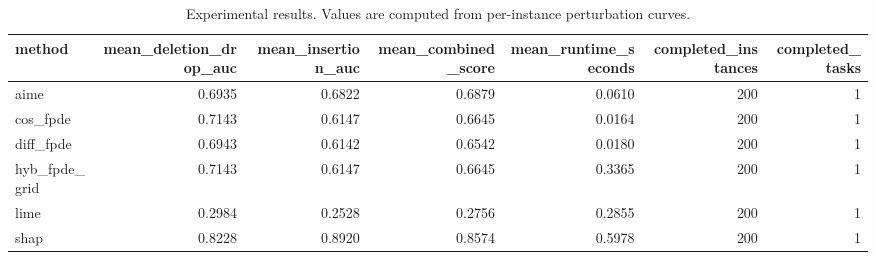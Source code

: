 \begin{table}[t]
\caption{Experimental results. Values are computed from per-instance perturbation curves.}
\label{tab:main_results_computed}
\centering
\begin{tabular}{lrrrrrr}
\toprule
method & mean\_deletion\_drop\_auc & mean\_insertion\_auc & mean\_combined\_score & mean\_runtime\_seconds & completed\_instances & completed\_tasks \\
\midrule
aime & 0.6935 & 0.6822 & 0.6879 & 0.0610 & 200 & 1 \\
cos\_fpde & 0.7143 & 0.6147 & 0.6645 & 0.0164 & 200 & 1 \\
diff\_fpde & 0.6943 & 0.6142 & 0.6542 & 0.0180 & 200 & 1 \\
hyb\_fpde\_grid & 0.7143 & 0.6147 & 0.6645 & 0.3365 & 200 & 1 \\
lime & 0.2984 & 0.2528 & 0.2756 & 0.2855 & 200 & 1 \\
shap & 0.8228 & 0.8920 & 0.8574 & 0.5978 & 200 & 1 \\
\bottomrule
\end{tabular}

\end{table}
